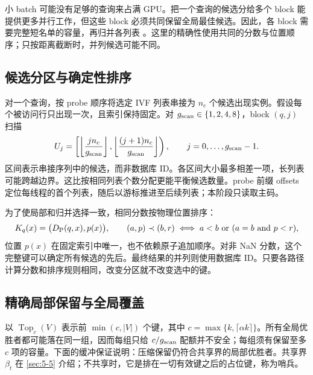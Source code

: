 小 batch 可能没有足够的查询来占满 GPU。把一个查询的候选分给多个 block 能提供更多并行工作，但这些 block 必须共同保留全局最佳候选。因此，各 block 需要完整短名单的容量，再归并各列表 \cite{johnson_gpu}。这里的精确性使用共同的分数与位置顺序；只按距离截断时，并列候选可能不同。

\subsection{候选分区与确定性排序}

对一个查询，按 probe 顺序将选定 IVF 列表串接为 $n_c$ 个候选出现实例。假设每个被访问行只出现一次，且索引保持固定。对 $g_{\mathrm{scan}}\in\{1,2,4,8\}$，block $(q,j)$ 扫描
\begin{equation}
 U_j=\left[\left\lfloor\frac{j n_c}{g_{\mathrm{scan}}}\right\rfloor,
              \left\lfloor\frac{(j+1)n_c}{g_{\mathrm{scan}}}\right\rfloor\right),
 \qquad j=0,\ldots,g_{\mathrm{scan}}-1.
 \label{eq:5-partition}
\end{equation}
区间表示串接序列中的候选，而非数据库 ID。各区间大小最多相差一项，长列表可能跨越边界。这比按相同列表个数分配更能平衡候选数量。probe 前缀 offsets 定位每线程的首个列表，随后以游标推进至后续列表；本阶段只读取主码。

为了使局部和归并选择一致，相同分数按物理位置排序：
\begin{equation}
 K_q(x)=\bigl(D_{\mathrm{P}}(q,x),p(x)\bigr),
 \qquad
 (a,p)\prec(b,r)\iff a<b\ \text{or}\ (a=b\ \text{and}\ p<r),
 \label{eq:5-primary-key}
\end{equation}
位置 $p(x)$ 在固定索引中唯一，也不依赖原子追加顺序。对非 NaN 分数，这个完整键可以确定所有候选的先后。最终结果的并列则使用数据库 ID。只要各路径计算分数和排序规则相同，改变分区就不改变选中的键。

\subsection{精确局部保留与全局覆盖}

以 $\operatorname{Top}_c(V)$ 表示前 $\min(c,|V|)$ 个键，其中 $c=\max\{k,\lceil\alpha k\rceil\}$。所有全局优胜者都可能落在同一组，因而每组只给 $c/g_{\mathrm{scan}}$ 配额并不安全；每组须有保留至多 $c$ 项的容量。下面的缓冲保证说明：压缩保留仍符合共享界的局部优胜者。共享界 $\beta_t$ 在 \cref{sec:5-5} 介绍；不共享时，它是排在一切有效键之后的占位键，称为哨兵。

